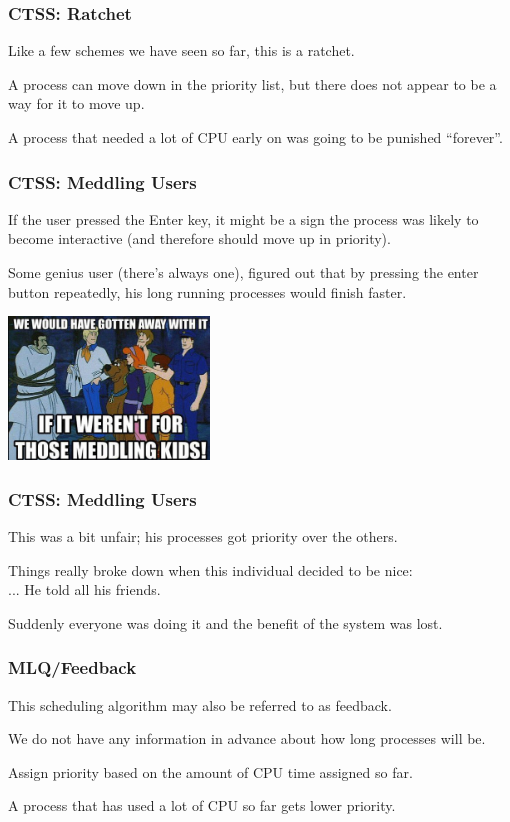 \begin{frame}
\frametitle{CTSS: Ratchet}

Like a few schemes we have seen so far, this is a ratchet. 

A process can move down in the priority list, but there does not appear to be a way for it to move up. 

A process that needed a lot of CPU early on was going to be punished ``forever''.


\end{frame}

\begin{frame}
\frametitle{CTSS: Meddling Users}

If the user pressed the Enter key, it might be a sign the process was likely to become interactive (and therefore should move up in priority). 

Some genius user (there's always one), figured out that by pressing the enter button repeatedly, his long running processes would finish faster. 

\begin{center}
	\includegraphics[width=0.4\textwidth]{images/meddling.jpg}
\end{center}

\end{frame}

\begin{frame}
\frametitle{CTSS: Meddling Users}

This was a bit unfair; his processes got priority over the others. 

Things really broke down when this individual decided to be nice:\\
\quad ... He told all his friends. 

Suddenly everyone was doing it and the benefit of the system was lost.


\end{frame}

\begin{frame}
\frametitle{MLQ/Feedback}

This scheduling algorithm may also be referred to as \alert{feedback}. 

We do not have any information in advance about how long processes will be. 

Assign priority based on the amount of CPU time assigned so far. 

A process that has used a lot of CPU so far gets lower priority.


\end{frame}


